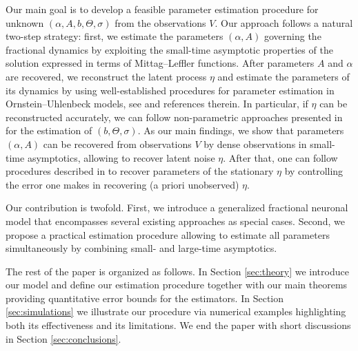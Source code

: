 \documentclass[11pt,reqno,oneside, a4paper]{amsart}
\numberwithin{equation}{section}
\theoremstyle{remark}
\begin{document}
Our main goal is to develop a feasible parameter estimation procedure for unknown  $(\alpha,A,b,\Theta,\sigma)$ from the observations $V$. Our approach follows a natural two-step strategy: first, we estimate the parameters $(\alpha,A)$ governing the fractional dynamics by exploiting the small-time asymptotic properties of the solution expressed in terms of Mittag--Leffler functions. After parameters $A$ and $\alpha$ are recovered, we reconstruct the latent process $\eta$ and estimate the parameters of its dynamics by using well-established procedures for parameter estimation in Ornstein--Uhlenbeck models, see \cite{Marko1,Vasicek2025} and references therein. In particular, if $\eta$ can be reconstructed accurately, we can follow non-parametric approaches presented in \cite{Marko1,Vasicek2025}  for the estimation of $(b,\Theta,\sigma)$. As our main findings, we show that parameters $(\alpha,A)$ can be recovered from observations $V$ by dense observations in small-time asymptotics, allowing to recover latent noise $\eta$. After that, one can follow procedures described in \cite{Vasicek2025} to recover parameters of the stationary $\eta$ by controlling the error one makes in recovering (a priori unobserved) $\eta$. 

Our contribution is twofold. First, we introduce a generalized fractional neuronal model that encompasses several existing approaches as special cases. Second, we propose a practical estimation procedure allowing to estimate all parameters simultaneously by combining small- and large-time asymptotics. 

The rest of the paper is organized as follows. In Section \ref{sec:theory} we introduce our model and define our estimation procedure together with our main theorems providing quantitative error bounds for the estimators. In Section \ref{sec:simulations} we illustrate our procedure via numerical examples highlighting both its effectiveness and its limitations. We end the paper with short discussions in Section \ref{sec:conclusions}.
\end{document}
